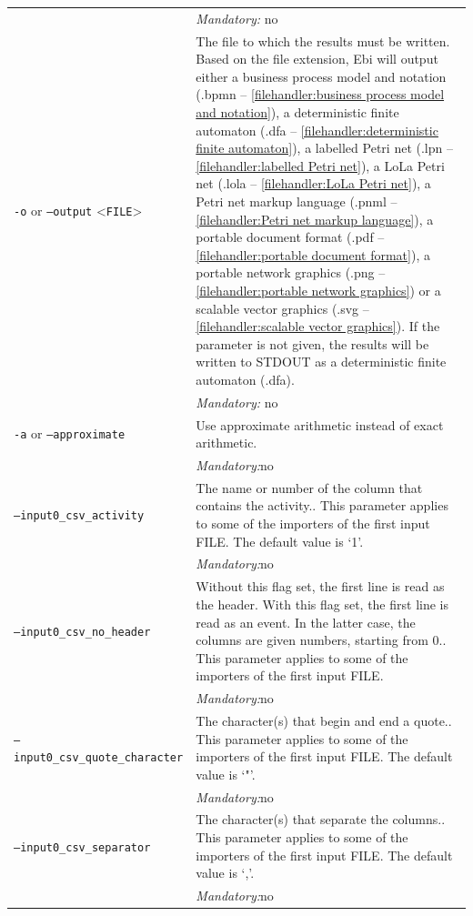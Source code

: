 {\begin{tabularx}{\linewidth}{lX}
&\textit{Mandatory:} \quad no\\
\texttt{-o} or \texttt{--output} <\texttt{FILE}> &
The file to which the results must be written. Based on the file extension, Ebi will output either a business process model and notation (.bpmn -- \cref{filehandler:business process model and notation}), a deterministic finite automaton (.dfa -- \cref{filehandler:deterministic finite automaton}), a labelled Petri net (.lpn -- \cref{filehandler:labelled Petri net}), a LoLa Petri net (.lola -- \cref{filehandler:LoLa Petri net}), a Petri net markup language (.pnml -- \cref{filehandler:Petri net markup language}), a portable document format (.pdf -- \cref{filehandler:portable document format}), a portable network graphics (.png -- \cref{filehandler:portable network graphics}) or a scalable vector graphics (.svg -- \cref{filehandler:scalable vector graphics}).
If the parameter is not given, the results will be written to STDOUT as a deterministic finite automaton (.dfa).\\
&\textit{Mandatory:} \quad no\\
\texttt{-a} or \texttt{--approximate} & Use approximate arithmetic instead of exact arithmetic.\\
&\textit{Mandatory:}\quad no\\
\texttt{--input0\_csv\_activity} & The name or number of the column that contains the activity.. This parameter applies to some of the importers of the first input FILE. The default value is `1'.\\
&\textit{Mandatory:}\quad no\\
\texttt{--input0\_csv\_no\_header} & Without this flag set, the first line is read as the header. 
    With this flag set, the first line is read as an event. In the latter case, the columns are given numbers, starting from 0.. This parameter applies to some of the importers of the first input FILE. \\
&\textit{Mandatory:}\quad no\\
\texttt{--input0\_csv\_quote\_character} & The character(s) that begin and end a quote.. This parameter applies to some of the importers of the first input FILE. The default value is `"'.\\
&\textit{Mandatory:}\quad no\\
\texttt{--input0\_csv\_separator} & The character(s) that separate the columns.. This parameter applies to some of the importers of the first input FILE. The default value is `,'.\\
&\textit{Mandatory:}\quad no\\

\end{tabularx}}
